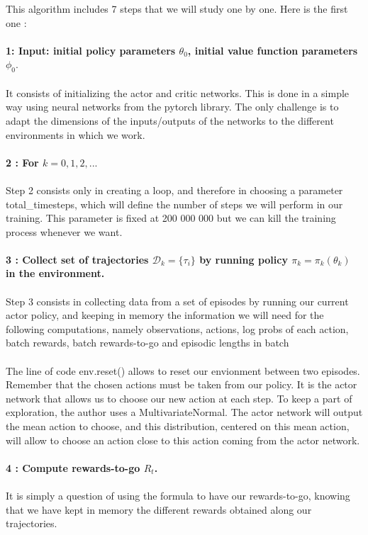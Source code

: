 \documentclass{article}
\begin{document}
This algorithm includes 7 steps that we will study one by one.
Here is the first one : 
\\ \\
\textbf{1: Input: initial policy parameters $\theta_0$, initial value function parameters $\phi_0$}.
\\ \\
It consists of initializing the actor and critic networks. This is done in a simple way using neural networks from the pytorch library. The only challenge is to adapt the dimensions of the inputs/outputs of the networks to the different environments in which we work. 
\\ \\
\textbf{2 : For $k=0,1,2,...$}
\\ \\
Step 2 consists only in creating a loop, and therefore in choosing a parameter total\_timesteps, which will define the number of steps we will perform in our training. This parameter is fixed at 200 000 000 but we can kill the training process whenever we want.
\\ \\
\textbf{3 : Collect set of trajectories $\mathcal{D}_k = \{\tau_i\}$ by running policy $\pi_k = \pi_k(\theta_k)$ in the environment.}
\\ \\
Step 3 consists in collecting data from a set of episodes by running our current actor policy, and keeping in memory the information we will need for the following computations, namely observations, actions, log probs of each action, batch rewards, batch rewards-to-go and episodic lengths in batch
\\ \\
The line of code env.reset() allows to reset our envionment between two episodes. 
Remember that the chosen actions must be taken from our policy. It is the actor network that allows us to choose our new action at each step. To keep a part of exploration, the author uses a MultivariateNormal. The actor network will output the mean action to choose, and this distribution, centered on this mean action, will allow to choose an action close to this action coming from the actor network. 
\\ \\
\textbf{4 : Compute rewards-to-go $\hat{R}_t$.}
\\ \\
It is simply a question of using the formula to have our rewards-to-go, knowing that we have kept in memory the different rewards obtained along our trajectories. 
\end{document}
